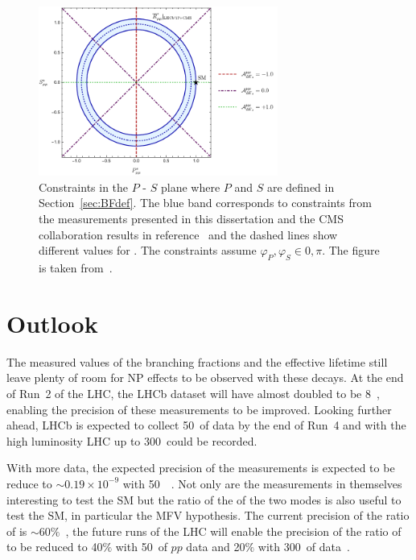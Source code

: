 \begin{figure}[tbp]
    \centering
        \includegraphics[width=0.7\textwidth]{./Figs/Summary/fig3.pdf}
    \caption{Constraints in the $P$ - $S$ plane where $P$ and $S$ are defined in Section~\ref{sec:BFdef}. The blue band corresponds to constraints from the \bmumu \BF measurements presented in this dissertation and the CMS collaboration results in reference~\cite{Chatrchyan:2013bka} and the dashed lines show different values for \ADG. The constraints assume $\varphi_{P}, \varphi_{S}\in {0, \pi}$. The figure is taken from~\cite{Fleischer:2017ltw}.}
    \label{fig:NPcontss}
\end{figure}


\section{Outlook}
The measured values of the branching fractions and the effective lifetime still leave plenty of room for NP effects to be observed with these decays. At the end of Run~2 of the LHC, the LHCb dataset will have almost doubled to be 8~\fb, enabling the precision of these measurements to be improved. Looking further ahead, LHCb is expected to collect 50~\fb of data by the end of Run~4 and with the high luminosity LHC up to 300~\fb could be recorded. 

With more data, the expected precision of the \BF measurements is expected to be reduce to $\sim 0.19 \times 10^{-9}$ with 50~\fb~\cite{LHCb-PUB-2014-040}. Not only are the \BF measurements in themselves interesting to test the SM but the ratio of the \BFs of the two modes is also useful to test the SM, in particular the MFV hypothesis. The current precision of the ratio of \BFs is $\sim 60\%$~\cite{CMS:2014xfa}, the future runs of the LHC will enable the precision of the ratio of \BFs to be reduced to 40$\%$ with 50~\fb of $pp$ data and 20$\%$ with 300~\fb of data~\cite{Aaij:2244311}. 

